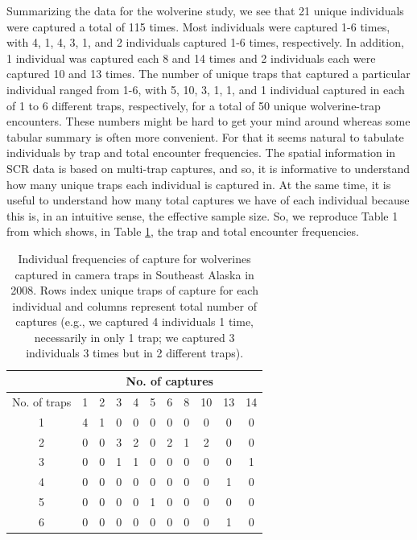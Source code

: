 Summarizing the data for the wolverine study, we see that 21
unique individuals were captured a total of 115 times. Most
individuals were captured 1-6 times, with 4, 1, 4, 3, 1, and 2
individuals captured 1-6 times, respectively.  In addition, 1
individual was captured each 8 and 14 times and 2 individuals each
were captured 10 and 13 times.  The number of unique traps that
captured a particular individual ranged from 1-6, with 5, 10, 3, 1, 1,
and 1 individual captured in each of 1 to 6 different traps, respectively, for a
total of 50 unique wolverine-trap encounters.  These numbers might be
hard to get your mind around whereas some tabular summary is often
more convenient. For that it seems natural to tabulate individuals by
trap and total encounter frequencies. The spatial information in SCR
data is based on multi-trap captures,
 and so, it is informative to understand how many unique traps each
individual is captured in. At the same time, it is useful to
understand how many total captures we have of each individual because
this is, in an intuitive sense, the effective sample size.  So, we
reproduce Table 1 from \citet{royle_etal:2011jwm} which shows,
in Table \ref{scr0.tab.wolverine}, the trap
and total encounter frequencies.



\begin{table} [htp]
  \caption{Individual frequencies of capture for wolverines captured
    in camera traps in Southeast Alaska in 2008. Rows index unique
    traps of capture for each individual
and columns represent total number of captures
    (e.g., we captured 4 individuals 1 time, necessarily in only 1
    trap; we captured 3 individuals 3 times but in 2 different traps).
}
\centering
\begin{tabular}{c c c c c c c c c c c}
\hline
 & \multicolumn{10}{c}{No. of captures} \\ \hline
No. of traps & 1 & 2 & 3 & 4 & 5 & 6 & 8 & 10 &13 &14 \\
\hline
1 & 4 & 1 & 0 & 0 & 0 & 0 & 0 & 0 & 0 & 0 \\
2 & 0 & 0 & 3 & 2 & 0 & 2 & 1 & 2 & 0 & 0 \\
3 & 0 & 0 & 1 & 1 & 0 & 0 & 0 & 0 & 0 & 1 \\
4 & 0 & 0 & 0 & 0 & 0 & 0 & 0 & 0 & 1 & 0 \\
5 & 0 & 0 & 0 & 0 & 1 & 0 & 0 & 0 & 0 & 0 \\
6 & 0 & 0 & 0 & 0 & 0 & 0 & 0 & 0 & 1 & 0 \\
\hline
\end{tabular}
\label{scr0.tab.wolverine}
\end{table}


